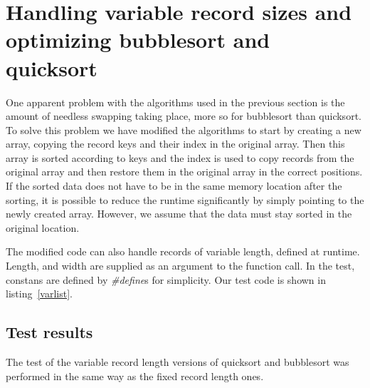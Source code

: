 \section{Handling variable record sizes and optimizing bubblesort and quicksort}
One apparent problem with the algorithms used in the previous section is the amount of needless swapping taking place, more so
for bubblesort than quicksort. To solve this problem we have modified the algorithms to start by creating a new array, copying 
the record keys and their index in the original array. Then this array is sorted according to keys and the index is used to copy 
records from the original array and then restore them in the original array in the correct positions. If the sorted data does not have
to be in the same memory location after the sorting, it is possible to reduce the runtime significantly by simply pointing to the newly
created array. However, we assume that the data must stay sorted in the original location.


The modified code can also handle records of variable length, defined at
runtime. Length, and width are supplied as an argument to the function call. In the test, constans are defined
by \emph{\#define}s for
simplicity.
Our test code is shown in listing~\ref{varlist}. 
\subsection{Test results}
The test of the variable record length versions of quicksort and bubblesort was performed in the same way as the fixed record length ones.
